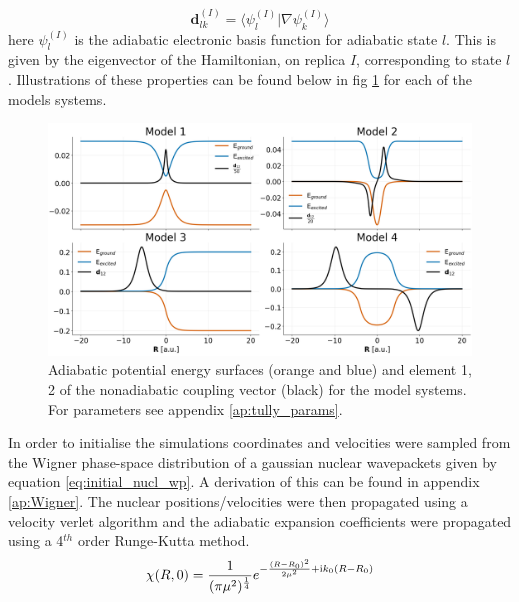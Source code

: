 \begin{equation}
  \mathbf{d}_{lk}^{(I)} = \langle \psi_{l}^{(I)} | \nabla \psi_k^{(I)} \rangle
  \label{eq:NACV_def}
\end{equation}
here $\psi_{l}^{(I)}$ is the adiabatic electronic basis function for adiabatic state $l$. This is given by the eigenvector of the Hamiltonian, on replica $I$, corresponding to state $l$. Illustrations of these  properties can be found below in fig \ref{fig:tully_schematics} for each of the  models systems.
\begin{figure}[H]
  \includegraphics[width=\textwidth]{../Chapter_tullyModels/model_schematics.png}
  \caption{\label{fig:tully_schematics}Adiabatic potential energy surfaces (orange and blue) and element 1, 2 of the nonadiabatic coupling vector (black) for the  model systems. For parameters see appendix \ref{ap:tully_params}.}
\end{figure}
\newpage
\noindent In order to initialise the simulations coordinates and velocities were sampled from the Wigner phase-space distribution of a gaussian nuclear wavepackets given by equation \eqref{eq:initial_nucl_wp}. A derivation of this can be found in appendix \ref{ap:Wigner}. The nuclear positions/velocities were then propagated using a velocity verlet algorithm and the adiabatic expansion coefficients were propagated using a 4$^{th}$ order Runge-Kutta method.
\begin{equation}
  \chi(R, 0) = \frac{1}{(\pi \mu^2)^{\frac{1}{4}}} e^{-\frac{(R - R_0)^2}{2 \mu^2} + \mathrm{i} k_0 (R - R_0) }
  \label{eq:initial_nucl_wp}
\end{equation}
